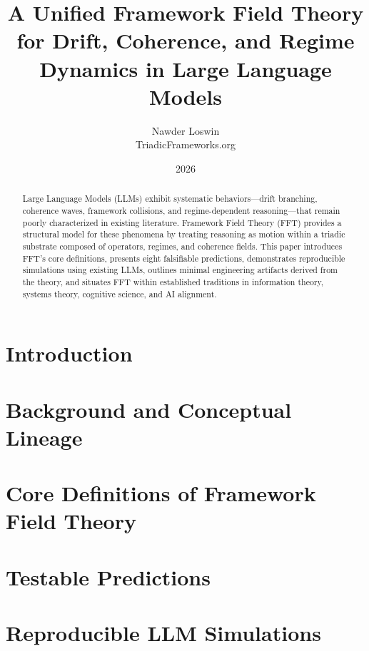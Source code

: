 \documentclass[11pt]{article}
\title{\textbf{A Unified Framework Field Theory for Drift, Coherence, and Regime Dynamics in Large Language Models}}
\author{Nawder Loswin \\ TriadicFrameworks.org}
\date{2026}
\begin{document}
\maketitle

\begin{abstract}
Large Language Models (LLMs) exhibit systematic behaviors---drift branching, coherence waves, framework collisions, and regime-dependent reasoning---that remain poorly characterized in existing literature. Framework Field Theory (FFT) provides a structural model for these phenomena by treating reasoning as motion within a triadic substrate composed of operators, regimes, and coherence fields. This paper introduces FFT's core definitions, presents eight falsifiable predictions, demonstrates reproducible simulations using existing LLMs, outlines minimal engineering artifacts derived from the theory, and situates FFT within established traditions in information theory, systems theory, cognitive science, and AI alignment.
\end{abstract}

\newpage

\section{Introduction}

\newpage

\section{Background and Conceptual Lineage}

\newpage

\section{Core Definitions of Framework Field Theory}

\newpage

\section{Testable Predictions}

\newpage

\section{Reproducible LLM Simulations}
\end{document}
